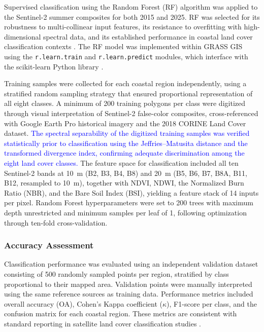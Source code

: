 \documentclass[coasts,article,submit,pdftex,moreauthors]{Definitions/mdpi}
\begin{document}
Supervised classification using the Random Forest (RF) algorithm was applied to the Sentinel-2 summer composites for both 2015 and 2025. RF was selected for its robustness to multi-collinear input features, its resistance to overfitting with high-dimensional spectral data, and its established performance in coastal land cover classification contexts \citep{VegPortugal2022}. The RF model was implemented within GRASS GIS using the \texttt{r.learn.train} and \texttt{r.learn.predict} modules, which interface with the scikit-learn Python library \citep{Lemenkova2023ML}.

Training samples were collected for each coastal region independently, using a stratified random sampling strategy that ensured proportional representation of all eight classes. A minimum of 200 training polygons per class were digitized through visual interpretation of Sentinel-2 false-color composites, cross-referenced with Google Earth Pro historical imagery and the 2018 CORINE Land Cover dataset. \textcolor{blue}{The spectral separability of the digitized training samples was verified statistically prior to classification using the Jeffries--Matusita distance and the transformed divergence index, confirming adequate discrimination among the eight land cover classes.} The feature space for classification included all ten Sentinel-2 bands at 10~m (B2, B3, B4, B8) and 20~m (B5, B6, B7, B8A, B11, B12, resampled to 10~m), together with NDVI, NDWI, the Normalized Burn Ratio (NBR), and the Bare Soil Index (BSI), yielding a feature stack of 14 inputs per pixel. Random Forest hyperparameters were set to 200 trees with maximum depth unrestricted and minimum samples per leaf of 1, following optimization through ten-fold cross-validation.

\subsubsection{Accuracy Assessment}
\label{sec:accuracy}

Classification performance was evaluated using an independent validation dataset consisting of 500 randomly sampled points per region, stratified by class proportional to their mapped area. Validation points were manually interpreted using the same reference sources as training data. Performance metrics included overall accuracy (OA), Cohen's Kappa coefficient ($\kappa$), F1-score per class, and the confusion matrix for each coastal region. These metrics are consistent with standard reporting in satellite land cover classification studies \citep{Lemenkova202505}.
\end{document}
